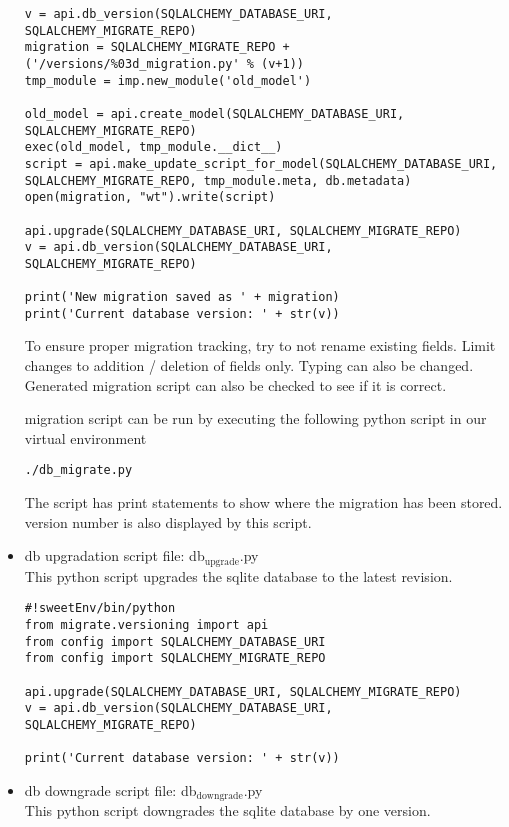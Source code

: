 \documentclass[11pt]{article}
\begin{document}
\begin{itemize}
\begin{verbatim}
v = api.db_version(SQLALCHEMY_DATABASE_URI, SQLALCHEMY_MIGRATE_REPO)
migration = SQLALCHEMY_MIGRATE_REPO + ('/versions/%03d_migration.py' % (v+1))
tmp_module = imp.new_module('old_model')

old_model = api.create_model(SQLALCHEMY_DATABASE_URI, SQLALCHEMY_MIGRATE_REPO)
exec(old_model, tmp_module.__dict__)
script = api.make_update_script_for_model(SQLALCHEMY_DATABASE_URI, SQLALCHEMY_MIGRATE_REPO, tmp_module.meta, db.metadata)
open(migration, "wt").write(script)

api.upgrade(SQLALCHEMY_DATABASE_URI, SQLALCHEMY_MIGRATE_REPO)
v = api.db_version(SQLALCHEMY_DATABASE_URI, SQLALCHEMY_MIGRATE_REPO)

print('New migration saved as ' + migration)
print('Current database version: ' + str(v))
\end{verbatim}

To ensure proper migration tracking, try to not rename existing
fields. Limit changes to addition / deletion of fields only. Typing
can also be changed. Generated migration script can also be checked to
see if it is correct. 

migration script can be run by executing the following python script
in our virtual environment


\begin{verbatim}
./db_migrate.py
\end{verbatim}
The script has print statements to show where the migration has been
stored. version number is also displayed by this script.






\item db upgradation script file: db$_{\mathrm{upgrade}}$.py\\
\label{sec-4-2-1-7}%
This python script upgrades the sqlite database to the latest revision.

\begin{verbatim}
#!sweetEnv/bin/python
from migrate.versioning import api
from config import SQLALCHEMY_DATABASE_URI
from config import SQLALCHEMY_MIGRATE_REPO

api.upgrade(SQLALCHEMY_DATABASE_URI, SQLALCHEMY_MIGRATE_REPO)
v = api.db_version(SQLALCHEMY_DATABASE_URI, SQLALCHEMY_MIGRATE_REPO)

print('Current database version: ' + str(v))
\end{verbatim}



\item db downgrade script file: db$_{\mathrm{downgrade}}$.py\\
\label{sec-4-2-1-8}%
This python script downgrades the sqlite database by one version.


\end{itemize}
\end{document}
